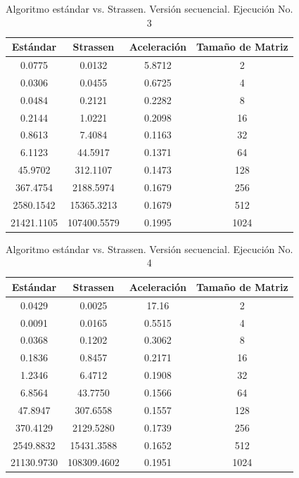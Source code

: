 \documentclass{article}
\begin{document}
\begin{table}[ht]
\centering
\begin{tabular}{|c|c|c|c|}
\hline
\textbf{Estándar} & \textbf{Strassen} & \textbf{Aceleración} & \textbf{Tamaño de Matriz} \\
\hline
0.0775 & 0.0132 & 5.8712 & 2 \\
0.0306 & 0.0455 & 0.6725 & 4 \\
0.0484 & 0.2121 & 0.2282 & 8 \\
0.2144 & 1.0221 & 0.2098 & 16 \\
0.8613 & 7.4084 & 0.1163 & 32 \\
6.1123 & 44.5917 & 0.1371 & 64 \\
45.9702 & 312.1107 & 0.1473 & 128 \\
367.4754 & 2188.5974 & 0.1679 & 256 \\
2580.1542 & 15365.3213 & 0.1679 & 512 \\
21421.1105 & 107400.5579 & 0.1995 & 1024 \\
\hline
\end{tabular}
\caption{Algoritmo estándar vs. Strassen. Versión secuencial. Ejecución No. 3}
\end{table}

\clearpage

\begin{table}[ht]
\centering
\begin{tabular}{|c|c|c|c|}
\hline
\textbf{Estándar} & \textbf{Strassen} & \textbf{Aceleración} & \textbf{Tamaño de Matriz} \\
\hline
0.0429 & 0.0025 & 17.16 & 2 \\
0.0091 & 0.0165 & 0.5515 & 4 \\
0.0368 & 0.1202 & 0.3062 & 8 \\
0.1836 & 0.8457 & 0.2171 & 16 \\
1.2346 & 6.4712 & 0.1908 & 32 \\
6.8564 & 43.7750 & 0.1566 & 64 \\
47.8947 & 307.6558 & 0.1557 & 128 \\
370.4129 & 2129.5280 & 0.1739 & 256 \\
2549.8832 & 15431.3588 & 0.1652 & 512 \\
21130.9730 & 108309.4602 & 0.1951 & 1024 \\
\hline
\end{tabular}
\caption{Algoritmo estándar vs. Strassen. Versión secuencial. Ejecución No. 4}
\end{table}
\end{document}
